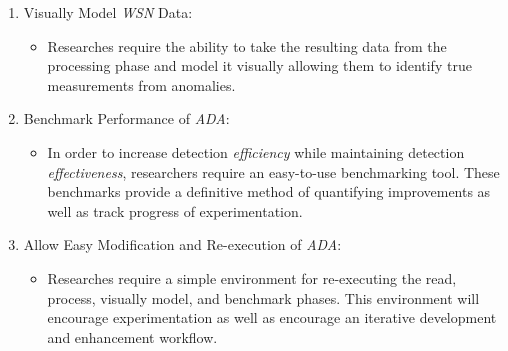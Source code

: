 \documentclass[twoside]{article}
\begin{document}
\begin{multicols}{2}
\begin{enumerate}
\begin{enumerate}
\begin{itemize}
				\end{itemize}
		\end{enumerate}
	\item Visually Model \textit{WSN} Data:
		\begin{itemize}
			\item Researches require the ability to take the resulting data from the processing phase and model it visually allowing them to identify true measurements from anomalies.
		\end{itemize}
	\item Benchmark Performance of \textit{ADA}:
		\begin{itemize}
			\item In order to increase detection \textit{efficiency} while maintaining detection \textit{effectiveness}, researchers require an easy-to-use benchmarking tool. These benchmarks provide a definitive method of quantifying improvements as well as track progress of experimentation.
		\end{itemize}
	\item Allow Easy Modification and Re-execution of \textit{ADA}:
		\begin{itemize}
			\item Researches require a simple environment for re-executing the read, process, visually model, and benchmark phases. This environment will encourage experimentation as well as encourage an iterative development and enhancement workflow.
		\end{itemize}
\end{enumerate}


\end{multicols}
\end{document}
